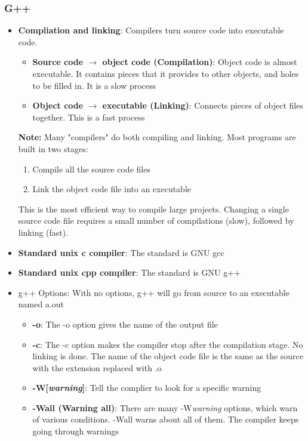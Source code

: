 \documentclass{report}
\begin{document}
   \subsubsection{G++}
   \begin{itemize}
       \item \textbf{Compliation and linking}:
           Compilers turn source code into executable code.
           \begin{itemize}
               \item \textbf{Source code $\to$ object code (Compilation)}: Object code is almost executable. It contains pieces that it provides to other objects, and holes to be filled in. It is a slow process
               \item \textbf{Object code $\to$ executable (Linking)}: Connects pieces of object files together. This is a fast process
           \end{itemize}
           \bigbreak \noindent 
           \textbf{Note:}  Many "compilers" do both compiling and linking. Most programs are built in two stages:
           \begin{enumerate}
               \item Compile all the source code files
                \item Link the object code file into an executable
           \end{enumerate}
           This is the most efficient way to compile large projects.  Changing a single source code file requires a small number of compilations (slow), followed by linking (fast).
        \item \textbf{Standard unix c compiler}: The standard is GNU gcc
        \item \textbf{Standard unix cpp compiler}: The standard is GNU g++
        \item {g++ Options}: With no options, g++ will go from source to an executable named a.out
            \begin{itemize}
                \item \textbf{-o}: The -o option gives the name of the output file
                \item \textbf{-c}: The -c option makes the compiler stop after the compilation stage. No linking is done. The name of the object code file is the same as the source with the extension replaced with .o
                \item \textbf{-W[\textit{warning}]}: Tell the complier to look for a specific warning
                \item \textbf{-Wall (Warning all)}: There are many -W\textit{warning} options, which warn of various conditions. -Wall warns about all of them. The compiler keeps going through warnings

\end{itemize}
\end{itemize}
\end{document}
